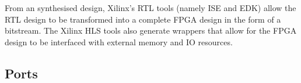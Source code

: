 From an  synthesised design, Xilinx's \gls{RTL} tools (namely
\gls{ISE} and \gls{EDK}) allow the \gls{RTL} design to be transformed into a
complete \gls{FPGA} design in the form of a bitstream. The Xilinx \gls{HLS}
tools also generate wrappers that allow for the \gls{FPGA} design to be
interfaced with external memory and \gls{IO} resources.

\subsection{Ports}
\label{hls:ports}
\begin{comment}
Clock port
Reset port
Block-level handshaking ports
Output valid signal

A clock and reset port are added to the design.
 AutoESL adds design-level handshake signals by default: ports ap_start, ap_done and ap_idle.
 If the function has a return value, output port ap_return is added to the RTL interface.
 Function arguments which are both read from and written to, are synthesized as separate input and output ports (sum_i and sum_o in Figure 1).
 By default, input pass-by-value arguments and pointers will be synthesized as simple wire ports with no associated handshaking signal.
 By default, output pointers will be synthesized with an associated output valid signal to indicate when the output data is valid.

Basic Pointers
A function with basic pointers on the top-level interface, such as shown in Example 7, produces no issues for HLS. The pointer can be synthesized to either a simple wire interface or an interface protocol using handshakes.

To be synthesized as a FIFO interface, a pointer must be read-only or write-only.

Pointer Arithmetic
The problem with the pointer arithmetic is that it does not access the pointer data in sequence. Wire, handshake or FIFO interfaces have no way of accessing data out of order:
 A wire interface will read data when the design is ready to consume the data or write the data when the data is ready.
 Handshake and FIFO interfaces will read and write when the control signals permit the operation to proceed.

Wire, handshake or FIFO interfaces can only be used on streaming data and therefore cannot be used in conjunction with pointer arithmetic (unless it indexes the data starting at zero and then proceeds sequentially).


\end{comment}
